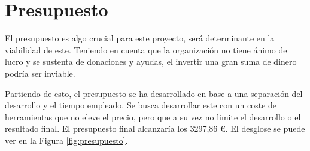 \section{Presupuesto}

El presupuesto es algo crucial para este proyecto, será determinante en la viabilidad de este. Teniendo en cuenta que la organización no tiene ánimo de lucro y se sustenta de donaciones y ayudas, el invertir una gran suma de dinero podría ser inviable.

Partiendo de esto, el presupuesto se ha desarrollado en base a una separación del desarrollo y el tiempo empleado. Se busca desarrollar este con un coste de herramientas que no eleve el precio, pero que a su vez no limite el desarrollo o el resultado final. El presupuesto final alcanzaría los 3297,86 €. El desglose se puede ver en la Figura \ref{fig:presupuesto}.

